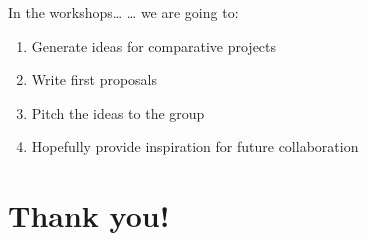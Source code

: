 \documentclass[
  ignorenonframetext,
]{beamer}
\begin{document}
\begin{frame}{In the workshops\ldots{}}
\protect\hypertarget{in-the-workshops}{}
\ldots{} we are going to:

\begin{enumerate}
\item
  Generate ideas for comparative projects
\item
  Write first proposals
\item
  Pitch the ideas to the group
\item
  Hopefully provide inspiration for future collaboration
\end{enumerate}
\end{frame}

\hypertarget{thank-you-1}{%
\section{Thank you!}\label{thank-you-1}}
\end{document}

